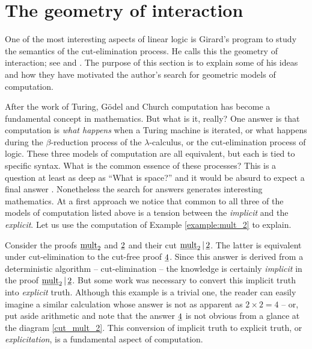 \documentclass[english,letter paper,12pt,reqno]{article}
\theoremstyle{example}
\numberwithin{equation}{section}
\def\inta{\bold{int}}
\begin{document}
\section{The geometry of interaction}\label{section:goi}

One of the most interesting aspects of linear logic is Girard's program to study the semantics of the cut-elimination process. He calls this the geometry of interaction; see \cite[\S III]{girard_towards} and \cite{girard_goi1,girard_goi2,girard_goi3}. The purpose of this section is to explain some of his ideas and how they have motivated the author's search for geometric models of computation. 

After the work of Turing, G\"odel and Church \cite{soare} computation has become a fundamental concept in mathematics. But what is it, really? One answer is that computation is \emph{what happens} when a Turing machine is iterated, or what happens during the $\beta$-reduction process of the $\lambda$-calculus, or the cut-elimination process of logic. These three models of computation are all equivalent, but each is tied to specific syntax. What is the common essence of these processes? This is a question at least as deep as ``What is space?'' and it would be absurd to expect a final answer \cite{denning}. Nonetheless the search for answers generates interesting mathematics. At a first approach we notice that common to all three of the models of computation listed above is a tension between the \emph{implicit} and the \emph{explicit}. Let us use the computation of Example \ref{example:mult_2} to explain.  

Consider the proofs $\underline{\mathrm{mult}}_2$ and $\underline{2}$ and their cut $\underline{\mathrm{mult}}_2 \,|\, \underline{2}$. The latter is equivalent under cut-elimination to the cut-free proof $\underline{4}$. Since this answer is derived from a deterministic algorithm -- cut-elimination -- the knowledge is certainly \emph{implicit} in the proof $\underline{\mathrm{mult}}_2 \,|\, \underline{2}$. But some work was necessary to convert this implicit truth into \emph{explicit} truth. Although this example is a trivial one, the reader can easily imagine a similar calculation whose answer is not as apparent as $2 \times 2 = 4$ -- or, put aside arithmetic and note that the answer $\underline{4}$ is not obvious from a glance at the diagram \eqref{cut_mult_2}. This conversion of implicit truth to explicit truth, or \emph{explicitation}, is a fundamental aspect of computation.
\\
\end{document}
